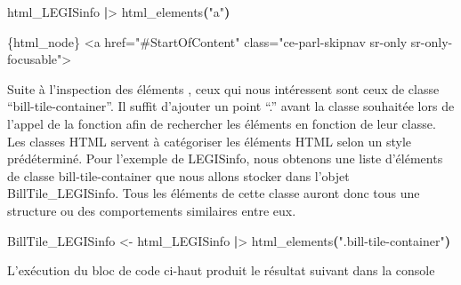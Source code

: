 \documentclass[
  letterpaper,
  DIV=11,
  numbers=noendperiod]{scrreprt}
\newenvironment{Shaded}{\begin{snugshade}}{\end{snugshade}}
\newcommand{\ExtensionTok}[1]{\textcolor[rgb]{0.00,0.23,0.31}{#1}}
\newcommand{\KeywordTok}[1]{\textcolor[rgb]{0.00,0.23,0.31}{\textbf{#1}}}
\newcommand{\NormalTok}[1]{\textcolor[rgb]{0.00,0.23,0.31}{#1}}
\newcommand{\OperatorTok}[1]{\textcolor[rgb]{0.37,0.37,0.37}{#1}}
\newcommand{\StringTok}[1]{\textcolor[rgb]{0.13,0.47,0.30}{#1}}
\newcommand{\VariableTok}[1]{\textcolor[rgb]{0.07,0.07,0.07}{#1}}
\begin{document}
\begin{Shaded}
\begin{Highlighting}[]
\ExtensionTok{html\_LEGISinfo} \KeywordTok{|}\OperatorTok{\textgreater{}}\NormalTok{ html\_elements}\KeywordTok{(}\StringTok{"a"}\KeywordTok{)}
\end{Highlighting}
\end{Shaded}

\begin{Shaded}
\begin{Highlighting}[]
\ExtensionTok{\{html\_node\}}
\OperatorTok{\textless{}}\NormalTok{a }\VariableTok{href}\OperatorTok{=}\StringTok{"\#StartOfContent"} \VariableTok{class}\OperatorTok{=}\StringTok{"ce{-}parl{-}skipnav sr{-}only sr{-}only{-}focusable"}\OperatorTok{\textgreater{}}
\end{Highlighting}
\end{Shaded}

Suite à l'inspection des éléments , ceux qui nous intéressent sont ceux
de classe ``bill-tile-container''. Il suffit d'ajouter un point ``.''
avant la classe souhaitée lors de l'appel de la fonction afin de
rechercher les éléments en fonction de leur classe. Les classes HTML
servent à catégoriser les éléments HTML selon un style prédéterminé.
Pour l'exemple de LEGISinfo, nous obtenons une liste d'éléments de
classe bill-tile-container que nous allons stocker dans l'objet
BillTile\_LEGISinfo. Tous les éléments de cette classe auront donc tous
une structure ou des comportements similaires entre eux.

\begin{Shaded}
\begin{Highlighting}[]
\ExtensionTok{BillTile\_LEGISinfo} \OperatorTok{\textless{}}\NormalTok{{-} html\_LEGISinfo }\KeywordTok{|}\OperatorTok{\textgreater{}}\NormalTok{ html\_elements}\KeywordTok{(}\StringTok{".bill{-}tile{-}container"}\KeywordTok{)}
\end{Highlighting}
\end{Shaded}

L'exécution du bloc de code ci-haut produit le résultat suivant dans la
console
\end{document}

